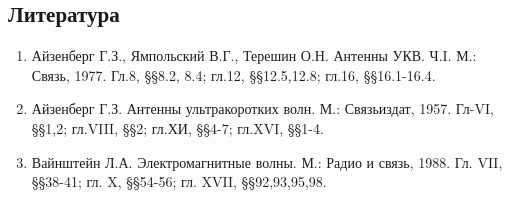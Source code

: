 \newpage
\begin{center}
    \section*{Литература}
\end{center}
\begin{enumerate}
    \item Айзенберг Г.З., Ямпольский В.Г., Терешин О.Н. Антенны УКВ. Ч.I. М.: Связь, 1977. Гл.8, §§8.2, 8.4; гл.12, 
    §§12.5,12.8; гл.16, §§16.1-16.4.
    \item Айзенберг Г.З. Антенны ультракоротких волн. М.: Связьиздат, 1957. Гл-VI, §§1,2; гл.VIII, §§2; гл.ХИ, §§4-7; гл.XVI, §§1-4.
    \item Вайнштейн Л.А. Электромагнитные волны. М.: Радио и связь, 1988. Гл. VII, §§38-41; гл. X, §§54-56; гл. XVII, §§92,93,95,98.    
\end{enumerate}

